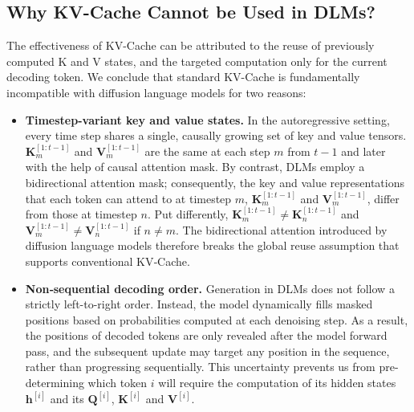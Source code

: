 \documentclass{article}
\newcommand{\bh}{\mathbf{h}}
\begin{document}
\subsection{Why KV-Cache Cannot be Used in DLMs?}
The effectiveness of KV-Cache can be attributed to the reuse of previously computed K and V states, and the targeted computation only for the current decoding token. We conclude that standard KV-Cache is fundamentally incompatible with diffusion language models for two reasons:
\begin{itemize}
    \item \textbf{Timestep-variant key and value states.} In the autoregressive setting, every time step shares a single, causally growing set of key and value tensors. $\mathbf{K}_m^{[1: t-1]}$ and $\mathbf{V}_m^{[1: t-1]}$ are the same at each step $m$ from $t-1$ and later with the help of causal attention mask. By contrast, DLMs employ a bidirectional attention mask; consequently, the key and value representations that each token can attend to at timestep $m$,  $\mathbf K_m^{[1:t-1]}$ and $\mathbf V_m^{[1:t-1]}$, differ from those at timestep $n$. Put differently, $\mathbf K_m^{[1:t-1]} \neq \mathbf K_n^{[1:t-1]}$ and $\mathbf V_m^{[1:t-1]} \neq \mathbf V_n^{[1:t-1]}$ if $n\neq m$. The bidirectional attention introduced by diffusion language models therefore breaks the global reuse assumption that supports conventional KV‑Cache.
    \item \textbf{Non‑sequential decoding order.} Generation in DLMs does not follow a strictly left-to-right order. Instead, the model dynamically fills masked positions based on probabilities computed at each denoising step. As a result, the positions of decoded tokens are only revealed after the model forward pass, and the subsequent update may target any position in the sequence, rather than progressing sequentially. This uncertainty prevents us from pre-determining which token $i$ will require the computation of its hidden states $\bh^{[i]}$ and its $\mathbf{Q}^{[i]}$, $\mathbf{K}^{[i]}$ and $\mathbf{V}^{[i]}$.
\end{itemize}
\end{document}
